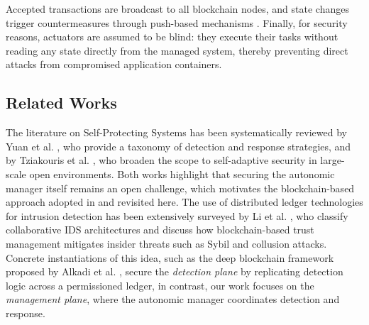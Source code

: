 Accepted transactions are broadcast to all blockchain nodes, and state changes trigger countermeasures through push-based mechanisms \cite{buterin2013ethereum}. Finally, for security reasons, actuators are assumed to be blind: they execute their tasks without reading any state directly from the managed system, thereby preventing direct attacks from compromised application containers.

\subsection{Related Works}
The literature on Self-Protecting Systems has been systematically reviewed by Yuan et al. \cite{yuan2014systematic}, who provide a taxonomy of detection and response strategies, and by Tziakouris et al. \cite{tziakouris2018survey}, who broaden the scope to self-adaptive security in large-scale open environments. Both works highlight that securing the autonomic manager itself remains an open challenge, which motivates the blockchain-based approach adopted in \cite{albero2026blockchain} and revisited here. The use of distributed ledger technologies for intrusion detection has been extensively surveyed by Li et al. \cite{li2022surveying}, who classify collaborative IDS architectures and discuss how blockchain-based trust management mitigates insider threats such as Sybil and collusion attacks. Concrete instantiations of this idea, such as the deep blockchain framework proposed by Alkadi et al. \cite{alkadi2021deep}, secure the \emph{detection plane} by replicating detection logic across a permissioned ledger, in contrast, our work focuses on the \emph{management plane}, where the autonomic manager coordinates detection and response.